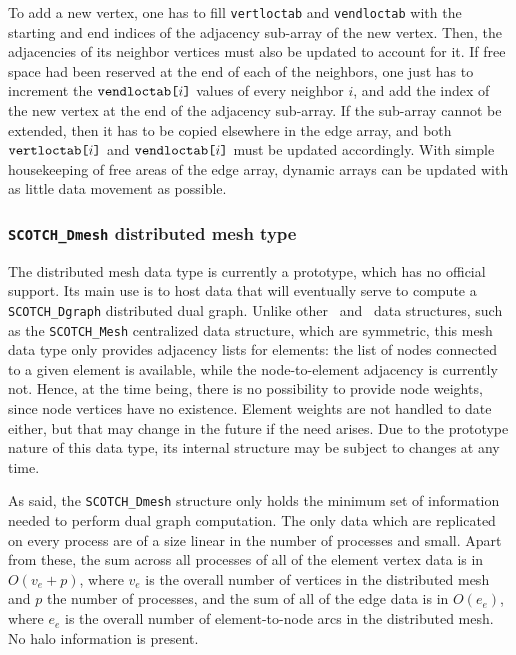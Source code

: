To add a new vertex, one has to fill {\tt vert\lbt loc\lbt tab} and {\tt vend\lbt loc\lbt tab}
with the starting and end indices of the adjacency sub-array of the
new vertex. Then, the adjacencies of its neighbor vertices must also
be updated to account for it. If free space had been reserved at the
end of each of the neighbors, one just has to increment the
${\tt vend\lbt loc\lbt tab}\mbox{\tt [}i\mbox{\tt ]}$ values of every
neighbor $i$, and add the index of the new vertex at the end of the
adjacency sub-array. If the sub-array cannot be extended, then it has
to be copied elsewhere in the edge array, and both ${\tt vert\lbt
loc\lbt tab}\mbox{\tt [}i\mbox{\tt ]}$ and ${\tt vend\lbt loc\lbt
tab}\mbox{\tt [}i\mbox{\tt ]}$ must be updated accordingly. With
simple housekeeping of free areas of the edge array, dynamic arrays
can be updated with as little data movement as possible.

\subsubsection{\texttt{SCOTCH\_Dmesh} distributed mesh type}
\label{sec-lib-type-dmesh}

The distributed mesh data type is currently a prototype, which has no
official support. Its main use is to host data that will eventually
serve to compute a \texttt{SCOTCH\_\lbt Dgraph} distributed dual
graph. Unlike other \scotch\ and \ptscotch\ data structures, such as
the \texttt{SCOTCH\_\lbt Mesh} centralized data structure, which are
symmetric, this mesh data type only provides adjacency lists for
elements: the list of nodes connected to a given element is available,
while the node-to-element adjacency is currently not. Hence, at the
time being, there is no possibility to provide node weights, since
node vertices have no existence. Element weights are not handled to
date either, but that may change in the future if the need arises. Due
to the prototype nature of this data type, its internal structure may
be subject to changes at any time.

As said, the \texttt{SCOTCH\_\lbt Dmesh} structure only holds the
minimum set of information needed to perform dual graph
computation. The only data which are replicated on every process are
of a size linear in the number of processes and small. Apart from
these, the sum across all processes of all of the element vertex data
is in $O(v_e+p)$, where $v_e$ is the overall number of vertices in the
distributed mesh and $p$ the number of processes, and the sum of all
of the edge data is in $O(e_e)$, where $e_e$ is the overall number of
element-to-node arcs in the distributed mesh. No halo information is
present.

